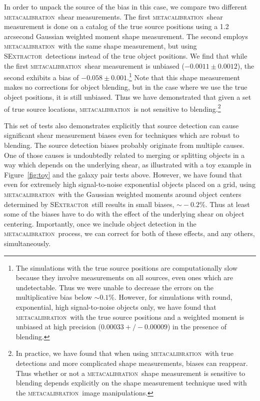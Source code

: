 \documentclass[fleqn,useAMS,usenatbib]{mnras}
\newcommand{\mcal}{\textsc{metacalibration}}
\newcommand{\sx}{\textsc{SExtractor}}
\begin{document}
In order to unpack the source of the bias in this case, we compare two different
\mcal\ shear measurements. The first \mcal\ shear measurement is done on a
catalog of the true source positions using a 1.2 arcsecond Gaussian weighted
moment shape measurement. The second employs \mcal\ with the same shape
measurement, but using \sx\ detections instead of the true object positions. We
find that while the first \mcal\ shear measurement is unbiased
($-0.0011\pm0.0012$), the second exhibits a bias of
$-0.058\pm0.001$.\footnote{The simulations with the true source positions are
computationally slow because they involve measurements on all sources, even ones
which are undetectable. Thus we were unable to decrease the errors on the
multiplicative bias below $\sim0.1\%$. However, for simulations with round,
exponential, high signal-to-noise objects only, we have found that \mcal\ with
the true source positions and a weighted moment is unbiased at high precision
($0.00033 +/- 0.00009$) in the presence of blending.} Note that this shape
measurement makes no corrections for object blending, but in the case where we
use the true object positions, it is still unbiased. Thus we have demonstrated
that given a set of true source locations, \mcal\ is not sensitive to
blending.\footnote{In practice, we have found that when using \mcal\ with true
detections and more complicated shape measurements, biases can reappear. Thus
whether or not a \mcal\ shape measurement is sensitive to blending depends
explicitly on the shape measurement technique used with the \mcal\ image
manipulations.}

This set of tests also demonstrates explicitly that source detection can cause
significant shear measurement biases even for techniques which are robust to
blending. The source detection biases probably originate from multiple causes.
One of those causes is undoubtedly related to merging or splitting objects in a
way which depends on the underlying shear, as illustrated with a toy example in
Figure~\ref{fig:toy} and the galaxy pair tests above. However, we have found
that even for extremely high signal-to-noise exponential objects placed on a
grid, using \mcal\ with the Gaussian weighted moments around object centers
determined by \sx\ still results in small biases, $\sim\!-0.2\%$. Thus at least
some of the biases have to do with the effect of the underlying shear on object
centering. Importantly, once we include object detection in the \mcal\ process,
we can correct for both of these effects, and any others, simultaneously.
\end{document}
